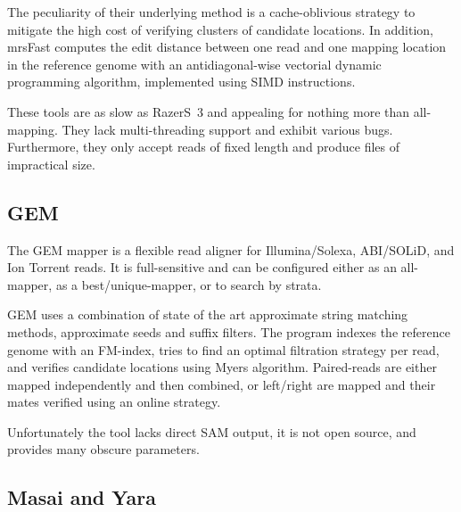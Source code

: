The peculiarity of their underlying method is a cache-oblivious strategy to mitigate the high cost of verifying clusters of candidate locations.
In addition, mrsFast computes the edit distance between one read and one mapping location in the reference genome with an antidiagonal-wise vectorial dynamic programming algorithm, implemented using SIMD instructions.

These tools are as slow as RazerS~3 and appealing for nothing more than all-mapping.
They lack multi-threading support and exhibit various bugs.
Furthermore, they only accept reads of fixed length and produce files of impractical size.


\subsection{GEM}

The GEM mapper \citep{Gem} is a flexible read aligner for Illumina/Solexa, ABI/SOLiD, and Ion Torrent reads.
It is full-sensitive and can be configured either as an all-mapper, as a best/unique-mapper, or to search by strata.

GEM uses a combination of state of the art approximate string matching methods, \eg approximate seeds and suffix filters.
The program indexes the reference genome with an FM-index, tries to find an optimal filtration strategy per read, and verifies candidate locations using Myers algorithm.
Paired-reads are either mapped independently and then combined, or left/right are mapped and their mates verified using an online strategy.

Unfortunately the tool lacks direct SAM output, it is not open source, and provides many obscure parameters.


\subsection{Masai and Yara}


\begin{landscape}
\begin{table}[h]
  \center
  \sffamily
	\renewcommand{\tabcolsep}{0.8ex}
	
\end{table}
\end{landscape}

